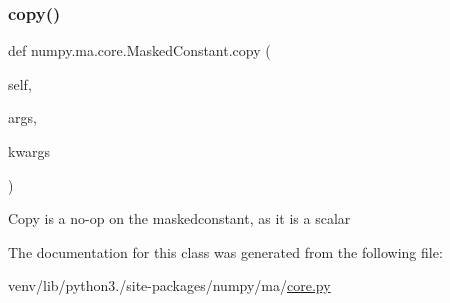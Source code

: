 \mbox{\label{classnumpy_1_1ma_1_1core_1_1MaskedConstant_ac126d3aa5bd755e307923233c9780b94}} 
\subsubsection{\texorpdfstring{copy()}{copy()}}
{\footnotesize\ttfamily def numpy.\+ma.\+core.\+Masked\+Constant.\+copy (\begin{DoxyParamCaption}\item[{}]{self,  }\item[{}]{args,  }\item[{}]{kwargs }\end{DoxyParamCaption})}

\begin{DoxyVerb}Copy is a no-op on the maskedconstant, as it is a scalar \end{DoxyVerb}
 

The documentation for this class was generated from the following file\+:\begin{DoxyCompactItemize}
\item 
venv/lib/python3./site-\/packages/numpy/ma/\hyperlink{numpy_2ma_2core_8py}{core.\+py}\end{DoxyCompactItemize}
